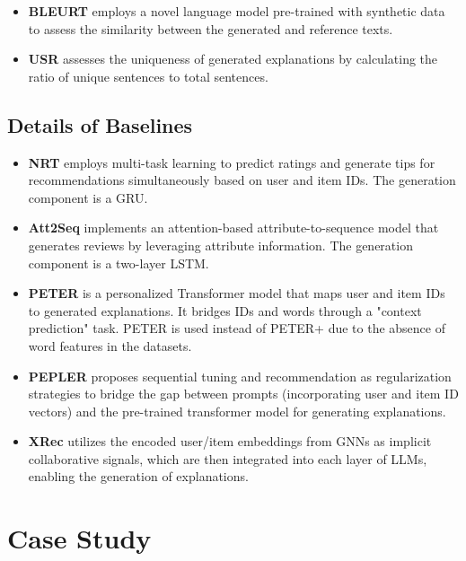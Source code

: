 \begin{itemize}[leftmargin=*]
    \item \textbf{BLEURT} \cite{sellam2020bleurt} employs a novel language model pre-trained with synthetic data to assess the similarity between the generated and reference texts.

    \item \textbf{USR} \cite{li2021personalized} assesses the uniqueness of generated explanations by calculating the ratio of unique sentences to total sentences.
\end{itemize}

\subsection{Details of Baselines}
\label{app:baselines}

\begin{itemize}[leftmargin=*]
    \item \textbf{NRT} \cite{li2017neural} employs multi-task learning to predict ratings and generate tips for recommendations simultaneously based on user and item IDs. The generation component is a GRU.
    \item \textbf{Att2Seq} \cite{dong2017learning} implements an attention-based attribute-to-sequence model that generates reviews by leveraging attribute information. The generation component is a two-layer LSTM.
    \item \textbf{PETER} \cite{li2021personalized} is a personalized Transformer model that maps user and item IDs to generated explanations. It bridges IDs and words through a "context prediction" task. PETER is used instead of PETER+ due to the absence of word features in the datasets.
    \item \textbf{PEPLER} \cite{li2023personalized} proposes sequential tuning and recommendation as regularization strategies to bridge the gap between prompts (incorporating user and item ID vectors) and the pre-trained transformer model for generating explanations.
    \item \textbf{XRec} \cite{ma2024xrec} utilizes the encoded user/item embeddings from GNNs as implicit collaborative signals, which are then integrated into each layer of LLMs, enabling the generation of explanations.
\end{itemize}


\section{Case Study}
\label{app:case}

